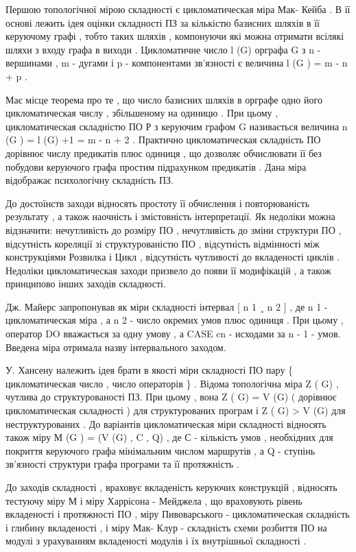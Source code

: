 Першою топологічної мірою складності є цикломатическая міра Мак- Кейба . В її основі лежить ідея оцінки складності ПЗ за кількістю базисних шляхів в її керуючому графі , тобто таких шляхів , компонуючи які можна отримати всілякі шляхи з входу графа в виходи . Цикломатичне число l (G) орграфа G з n - вершинами , m - дугами і p - компонентами зв'язності є величина l (G ) = m - n + p .

Має місце теорема про те , що число базисних шляхів в орграфе одно його цикломатическая числу , збільшеному на одиницю . При цьому , цикломатическая складністю ПО Р з керуючим графом G називається величина n (G ) = l (G) +1 = m - n + 2 . Практично цикломатическая складність ПО дорівнює числу предикатів плюс одиниця , що дозволяє обчислювати її без побудови керуючого графа простим підрахунком предикатів . Дана міра відображає психологічну складність ПЗ.

До достоїнств заходи відносять простоту її обчислення і повторюваність результату , а також наочність і змістовність інтерпретації. Як недоліки можна відзначити: нечутливість до розміру ПО , нечутливість до зміни структури ПО , відсутність кореляції зі структурованістю ПО , відсутність відмінності між конструкціями Розвилка і Цикл , відсутність чутливості до вкладеності циклів . Недоліки цикломатическая заходи призвело до появи її модифікацій , а також принципово інших заходів складності.

Дж. Майерс запропонував як міри складності інтервал {[} n 1 ¸ n 2 {]} , де n 1 - цикломатическая міра , а n 2 - число окремих умов плюс одиниця . При цьому , оператор DO вважається за одну умову , а CASE cn - исходами за n - 1 - умов. Введена міра отримала назву інтервального заходом.

У. Хансену належить ідея брати в якості міри складності ПО пару \{ цикломатическая число , число операторів \} . Відома топологічна міра Z ( G) , чутлива до структурованості ПЗ. При цьому , вона Z ( G) = V (G) ( дорівнює цикломатическая складності ) для структурованих програм і Z ( G) \textgreater{} V (G) для неструктурованих . До варіантів цикломатическая міри складності відносять також міру М (G ) = (V (G) , C , Q) , де С - кількість умов , необхідних для покриття керуючого графа мінімальним числом маршрутів , а Q - ступінь зв'язності структури графа програми та її протяжність .

До заходів складності , враховує вкладеність керуючих конструкцій , відносять тестуючу міру М і міру Харрісона - Мейджела , що враховують рівень вкладеності і протяжності ПО , міру Пивоварського - цикломатическая складність і глибину вкладеності , і міру Мак- Клур - складність схеми розбиття ПО на модулі з урахуванням вкладеності модулів і їх внутрішньої складності .

